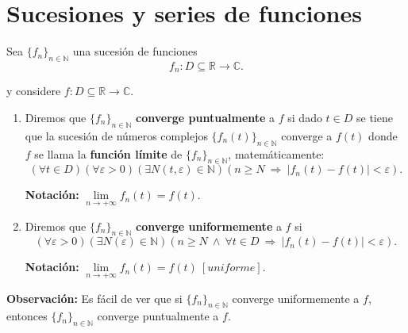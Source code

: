 \section{Sucesiones y series de funciones}

\begin{defi}
Sea $\{f_n\}_{n \in \mathbb{N}}$ una sucesión de funciones 
$$f_n: D \subseteq \mathbb{R} \longrightarrow \mathbb{C}.$$

y considere $f: D \subseteq \mathbb{R} \longrightarrow \mathbb{C}$.

\begin{enumerate}
    \item Diremos que $\{f_n\}_{n \in \mathbb{N}}$ \textbf{converge puntualmente} a $f$ si dado $t \in D$ se tiene que la sucesión de números complejos $\{f_n(t)\}_{n \in \mathbb{N}}$ converge a $f(t)$ donde $f$ se llama la \textbf{función límite} de $\{f_n\}_{n \in \mathbb{N}}$, matemáticamente:
    $$(\forall t \in D)(\forall \varepsilon > 0)(\exists N(t,\varepsilon) \in \mathbb{N})(n \geq N ~\Rightarrow~ |f_n(t) - f(t)| < \varepsilon).$$
    
    \textbf{Notación:} $\lim\limits_{n \to + \infty} f_n(t) = f(t)$.
    
    \item  Diremos que $\{f_n\}_{n \in \mathbb{N}}$ \textbf{converge uniformemente} a $f$ si 
     $$(\forall \varepsilon > 0)(\exists N(\varepsilon) \in \mathbb{N})(n \geq N ~\wedge~ \forall t \in D ~\Rightarrow~ |f_n(t) - f(t)| < \varepsilon).$$
     
     \textbf{Notación:} $\lim\limits_{n \to + \infty} f_n(t) = f(t) ~[uniforme]$.
\end{enumerate}

\end{defi}

\textbf{Observación:} Es fácil de ver que si $\{f_n\}_{n\in \mathbb{N}}$ converge uniformemente a $f$, entonces $\{f_n\}_{n\in \mathbb{N}}$ converge puntualmente a $f$.

